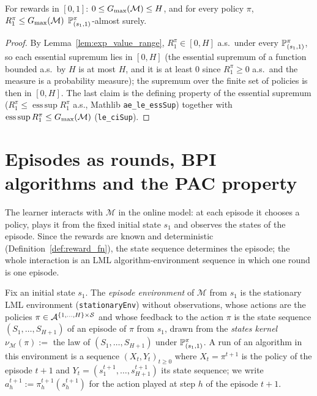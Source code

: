 \begin{lemma}\label{lem:gmax_le_horizon}
\leanok
{}
For rewards in $[0, 1]$: $0 \le G_{\max}(\mathcal M) \le H$, and for every policy $\pi$,
$R^\pi_1 \le G_{\max}(\mathcal M)$ $\mathbb{P}^\pi_{(s_1, 1)}$-almost surely.
\end{lemma}

\begin{proof}
\leanok
By Lemma~\ref{lem:exp_value_range}, $R^\pi_1 \in [0, H]$ a.s.\ under every $\mathbb{P}^\pi_{(s_1, 1)}$, so
each essential supremum lies in $[0, H]$ (the essential supremum of a function bounded a.s.\ by
$H$ is at most $H$, and it is at least $0$ since $R^\pi_1 \ge 0$ a.s.\ and the measure is a
probability measure); the supremum over the finite set of policies is then in $[0, H]$. The
last claim is the defining property of the essential supremum
($R^\pi_1 \le \operatorname{ess\,sup} R^\pi_1$ a.s., Mathlib \texttt{ae\_le\_essSup}) together with
$\operatorname{ess\,sup} R^\pi_1 \le G_{\max}(\mathcal M)$ (\texttt{le\_ciSup}).
\end{proof}

\section{Episodes as rounds, BPI algorithms and the PAC property}
\label{sec:mdp_bpi}

The learner interacts with $\mathcal M$ in the online model: at each episode it chooses a
policy, plays it from the fixed initial state $s_1$ and observes the states of the episode.
Since the rewards are known and deterministic (Definition~\ref{def:reward_fn}), the state
sequence determines the episode; the whole interaction is an LML algorithm-environment
sequence in which one round is one episode.

\begin{definition}\label{def:episode_env}
\leanok
{}
Fix an initial state $s_1$. The \emph{episode environment} of $\mathcal M$ from $s_1$ is the
stationary LML environment (\texttt{stationaryEnv}) without observations, whose actions are the
policies $\pi \in \mathcal{A}^{\{1, \dots, H\} \times \mathcal{S}}$ and whose feedback to the action $\pi$ is the
state sequence $(S_1, \dots, S_{H+1})$ of an episode of $\pi$ from $s_1$, drawn from the
\emph{states kernel} $\nu_{\mathcal M}(\pi) :=$ the law of $(S_1, \dots, S_{H+1})$ under
$\mathbb{P}^\pi_{(s_1, 1)}$. A run of an algorithm in this environment is a sequence
$(X_t, Y_t)_{t \ge 0}$ where $X_t = \pi^{t+1}$ is the policy of the episode $t + 1$ and
$Y_t = (s^{t+1}_1, \dots, s^{t+1}_{H+1})$ its state sequence; we write $a^{t+1}_h := \pi^{t+1}_h(s^{t+1}_h)$
for the action played at step $h$ of the episode $t + 1$.
\end{definition}

